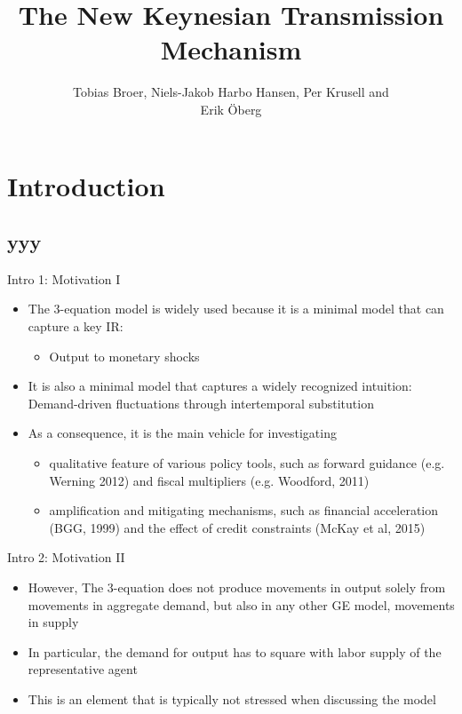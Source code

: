 \documentclass{beamer}
\title{The New Keynesian Transmission Mechanism}
\author{Tobias Broer, Niels-Jakob Harbo Hansen, Per Krusell and \\ Erik {\"O}berg}
\institute{Institute for International Economic Studies}
\newcommand{\bit}{\begin{itemize}}
\newcommand{\eit}{\end{itemize}}
\begin{document}
\begin{frame}
\maketitle
\end{frame}

\section{Introduction}
\subsection{yyy}

\begin{frame}{Intro 1: Motivation I}

\bit
	\item The 3-equation model is widely used because it is a minimal model that can capture a key IR:
		\bit
			\item Output to monetary shocks
		\eit
	\item It is also a minimal model that captures a widely recognized intuition: Demand-driven fluctuations through intertemporal substitution
	\item As a consequence, it is the main vehicle for investigating
		\bit
			\item qualitative feature of various policy tools, such as forward guidance (e.g. Werning 2012) and fiscal multipliers (e.g. Woodford, 2011)
			\item amplification and mitigating mechanisms, such as financial acceleration (BGG, 1999) and the effect of credit constraints (McKay et al, 2015)
		\eit
\eit


\end{frame}

\begin{frame}{Intro 2: Motivation II}

\bit
	\item However, The 3-equation does not produce movements in output solely from movements in aggregate demand, but also in any other GE model, movements in supply
	\item In particular, the demand for output has to square with labor supply of the representative agent
	\item This is an element that is typically not stressed when discussing the model  
\eit


\end{frame}
\end{document}
